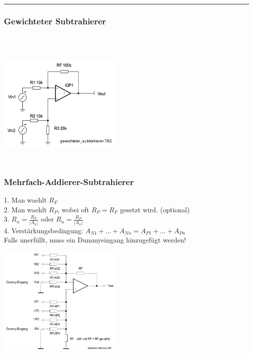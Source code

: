 \hrule

		\subsubsection{Gewichteter Subtrahierer }
			\begin{minipage}[b]{12cm}
            	\hspace*{10mm}\\
            	\hspace*{10mm}\\
            	\hspace*{10mm}
            \end{minipage}
			\begin{minipage}{6cm}
            	\includegraphics[width=6cm]{./bilder/gewichtsub.png}
            \end{minipage}\\
\newpage


		\subsubsection{Mehrfach-Addierer-Subtrahierer } 		
		\begin{minipage}[b]{12cm}
		1. Man waehlt $R_{F}$\\
		2. Man waehlt $R_{P}$, wobei oft $R_{P}=R_{F}$ gesetzt wird. (optional)\\
		3. $R_{n}=\frac{R_{F}}{\left|A_{n}\right|}$ oder
			$R_{n}=\frac{R_{P}}{\left|A_{n}\right|}$\\ 
		4. Verstärkungsbedingung: $A_{N1} +
		\ldots + A_{Nn} = A_{P1} + \ldots + A_{Pn}$ \\Falls unerfüllt, muss ein Dummyeingang hinzugefügt werden!
		\end{minipage}
		\begin{minipage}{6cm}
          	\includegraphics[width=6cm]{./bilder/mehrfach-addierer-subtrahierer.png} 
        \end{minipage}\\
		
